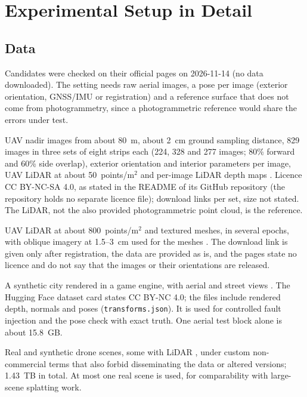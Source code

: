\section{Experimental Setup in Detail}
\label{sup:setup}

\subsection{Data}
Candidates were checked on their official pages on 2026-11-14 (no data downloaded). The setting needs
raw aerial images, a pose per image (exterior orientation, GNSS/IMU or registration) and a reference
surface that does not come from photogrammetry, since a photogrammetric reference would share the
errors under test.

 UAV nadir images from about 80~m, about 2~cm ground sampling distance,
829 images in three sets of eight strips each (224, 328 and 277 images; 80\% forward and 60\% side
overlap), exterior orientation and interior parameters per image, UAV LiDAR at about 50~points/m$^2$ and
per-image LiDAR depth maps \cite{data_usegeo}. Licence CC BY-NC-SA 4.0, as stated in the README of its
GitHub repository (the repository holds no separate licence file); download links per set, size not
stated. The LiDAR, not the also provided photogrammetric point cloud, is the reference.

 UAV LiDAR at about 800~points/m$^2$ and textured meshes, in several
epochs, with oblique imagery at 1.5--3~cm used for the meshes \cite{data_h3d}. The download link is given
only after registration, the data are provided as is, and the pages state no licence and do not say
that the images or their orientations are released. 

 A synthetic city rendered in a game engine, with aerial and street views
\cite{data_matrixcity}. The Hugging Face dataset card states CC BY-NC 4.0; the files include rendered depth,
normals and poses (\texttt{transforms.json}). It is used for controlled fault injection and the pose check
with exact truth. One aerial test block alone is about 15.8~GB.

 Real and synthetic drone scenes, some with LiDAR
\cite{data_urbanscene3d}, under custom non-commercial terms that also forbid disseminating the data or
altered versions; 1.43~TB in total. At most one real scene is used, for comparability with large-scene
splatting work. 

